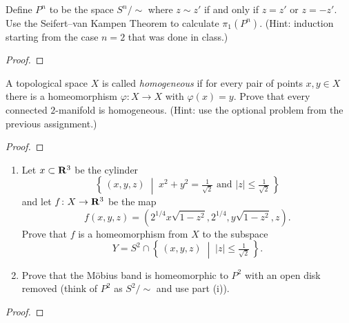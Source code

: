 \newpage
\begin{problem}[A]
Define $P^n$ to be the space $S^n/{\sim}$ where $z\sim z'$ if and only if
$z=z'$ or $z=-z'$. Use the Seifert--van Kampen Theorem to calculate
$\pi_1(P^n)$. (Hint: induction starting from the case $n=2$ that was done
in class.)
\end{problem}
\begin{proof}
\end{proof}
\newpage
\begin{problem}[B]
A topological space $X$ is called \emph{homogeneous} if for every pair of
points $x,y\in X$ there is a homeomorphism $\varphi\colon X\to X$ with
$\varphi(x)=y$. Prove that every connected $2$-manifold is
homogeneous. (Hint: use the optional problem from the previous assignment.)
\end{problem}
\begin{proof}
\end{proof}
\newpage
\begin{problem}
\begin{enumerate}[label=(\roman*)]
\item Let $x\subset\mathbf{R}^3$ be the cylinder
\[
\left\{\,(x,y,z)\;\middle|\;
\text{$x^2+y^2=\tfrac{1}{\sqrt{2}}$ and $|z|\leq \tfrac{1}{\sqrt{2}}$}\,\right\}
\]
and let $f\colon X\to\mathbf{R}^3$ be the map
\[
f(x,y,z)=\left(2^{1/4}x\sqrt{1-z^2},2^{1/4},y\sqrt{1-z^2},z\right).
\]
Prove that $f$ is a homeomorphism from $X$ to the subspace
\[
Y=S^2\cap\left\{\,(x,y,z)\;\middle|\;|z|\leq\tfrac{1}{\sqrt{2}}\,\right\}.
\]
\item Prove that the \textgerman{Möbius} band is homeomorphic to $P^2$ with an
  open disk removed (think of $P^2$ as $S^2/{\sim}$ and use part (i)).
\end{enumerate}
\end{problem}
\begin{proof}
\end{proof}


